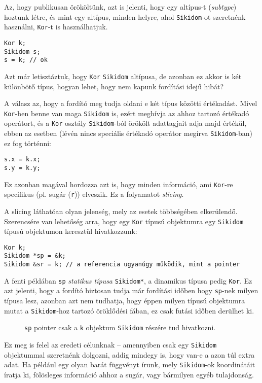 \documentclass[../cpp_book/cpp_book.tex]{subfiles}
\begin{document}
	Az, hogy publikusan örököltünk, azt is jelenti, hogy egy {altípus}-t (\textit{subtype}) hoztunk létre, és mint egy altípus, minden helyre, ahol \texttt{Sikidom}-ot szeretnénk használni, \texttt{Kor}-t is használhatjuk. 
	\begin{lstlisting}
Kor k;
Sikidom s;
s = k; // ok
	\end{lstlisting}
	Azt már letisztáztuk, hogy \texttt{Kor} \texttt{Sikidom} altípusa, de azonban ez akkor is két különbötő típus, hogyan lehet, hogy nem kapunk fordítási idejű hibát?
	
	A válasz az, hogy a fordító meg tudja oldani e két típus közötti értékadást. Mivel \texttt{Kor}-ben benne van maga \texttt{Sikidom} is, ezért meghívja az ahhoz tartozó értékadó operátort, és a \texttt{Kor} osztály \texttt{Sikidom}-ból örökölt adattagjait adja majd értékül, ebben az esetben (lévén nincs speciális értékadó operátor megírva \texttt{Sikidom}-ban) ez fog történni:
	\begin{lstlisting}
s.x = k.x;
s.y = k.y;
	\end{lstlisting}
	Ez azonban magával hordozza azt is, hogy minden információ, ami \texttt{Kor}-re specifikus (pl. sugár (\texttt{r})) elveszik. Ez a folyamatot \textit{slicing}. 
	
	A slicing láthatóan olyan jelenség, mely az esetek többségében elkerülendő. Szerencsére van lehetőség arra, hogy egy \texttt{Kor} típusú objektumra egy \texttt{Sikidom} típusú objektumon keresztül hivatkozzunk:
	\begin{lstlisting}
Kor k;
Sikidom *sp = &k;
Sikidom &sr = k; // a referencia ugyanúgy működik, mint a pointer
	\end{lstlisting}
	A fenti példában \texttt{sp} \textit{statikus típusa} \texttt{Sikidom*}, a dinamikus típusa pedig \texttt{Kor}. Ez azt jelenti, hogy a fordító biztosan tudja már fordítási időben hogy \texttt{sp}-nek milyen típusa lesz, azonban azt nem tudhatja, hogy éppen milyen típusú objektumra mutat a \texttt{Sikidom}-hoz tartozó öröklődési fában, ez csak futási időben derülhet ki.
	\begin{figure}[!h]
		\centering
		
		
		\caption{\texttt{sp} pointer csak a \texttt{k} objektum \texttt{Sikidom} részére tud hivatkozni.}\label{fig_slicing}
	\end{figure}

	Ez meg is felel az eredeti célunknak -- amennyiben csak egy \texttt{Sikidom} objektummal szeretnénk dolgozni, addig mindegy is, hogy van-e a azon túl extra adat. Ha például egy olyan barát függvényt írunk, mely \texttt{Sikidom}-ok koordinátáit íratja ki, fölösleges információ ahhoz a sugár, vagy bármilyen egyéb tulajdonság.
	
\end{document}
